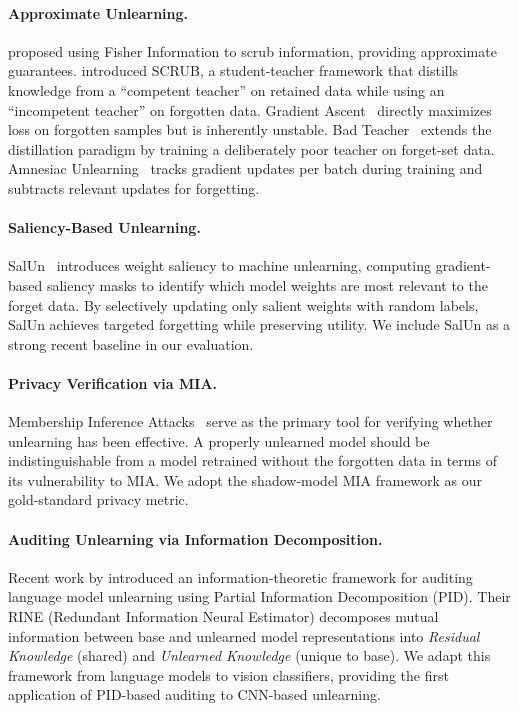 \documentclass[11pt]{article}
\begin{document}
\paragraph{Approximate Unlearning.}
\citet{golatkar2020eternal} proposed using Fisher Information to scrub information, providing approximate guarantees.
\citet{kurmanji2023towards} introduced SCRUB, a student-teacher framework that distills knowledge from a ``competent teacher'' on retained data while using an ``incompetent teacher'' on forgotten data. Gradient Ascent~\citep{thudi2022unrolling} directly maximizes loss on forgotten samples but is inherently unstable.
Bad Teacher~\citep{chundawat2023can} extends the distillation paradigm by training a deliberately poor teacher on forget-set data. Amnesiac Unlearning~\citep{graves2021amnesiac} tracks gradient updates per batch during training and subtracts relevant updates for forgetting.

\paragraph{Saliency-Based Unlearning.}
SalUn~\citep{fan2023salun} introduces weight saliency to machine unlearning, computing gradient-based saliency masks to identify which model weights are most relevant to the forget data. By selectively updating only salient weights with random labels, SalUn achieves targeted forgetting while preserving utility. We include SalUn as a strong recent baseline in our evaluation.

\paragraph{Privacy Verification via MIA.}
Membership Inference Attacks~\citep{shokri2017membership, carlini2022membership} serve as the primary tool for verifying whether unlearning has been effective. A properly unlearned model should be indistinguishable from a model retrained without the forgotten data in terms of its vulnerability to MIA. We adopt the shadow-model MIA framework as our gold-standard privacy metric.

\paragraph{Auditing Unlearning via Information Decomposition.}
Recent work by \citet{mazzetto2025auditing} introduced an information-theoretic framework for auditing language model unlearning using Partial Information Decomposition (PID). Their RINE (Redundant Information Neural Estimator) decomposes mutual information between base and unlearned model representations into \textit{Residual Knowledge} (shared) and \textit{Unlearned Knowledge} (unique to base). We adapt this framework from language models to vision classifiers, providing the first application of PID-based auditing to CNN-based unlearning.
\end{document}
